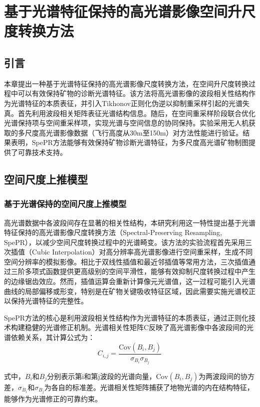 \chapter{基于光谱特征保持的高光谱影像空间升尺度转换方法}
\section{引言}
本章提出一种基于光谱特征保持的高光谱影像尺度转换方法，在空间升尺度转换过程中可以有效保持矿物的诊断光谱特征。该方法将高光谱影像的波段相关性结构作为光谱特征的本质表征，并引入Tikhonov正则化伪逆以抑制重采样引起的光谱失真。首先利用波段相关矩阵表征光谱结构信息。随后，在空间重采样阶段联合优化光谱保持项与空间重采样项，实现光谱与空间信息的协同保持。实验采用无人机获取的多尺度高光谱影像数据（飞行高度从30m至150m）对方法性能进行验证。结果表明，SpePR方法能够有效保持矿物诊断光谱特征，为多尺度高光谱矿物制图提供了可靠技术支持。
\section{空间尺度上推模型}
\subsection{基于光谱保持的空间尺度上推模型}
高光谱数据中各波段间存在显著的相关性结构\cite{manolakis2008spectral}，本研究利用这一特性提出基于光谱特征保持的高光谱影像尺度转换方法（Spectral-Preserving Resampling, SpePR），以减少空间尺度转换过程中的光谱畸变。该方法的实验流程首先采用三次插值（Cubic Interpolation）对高分辨率高光谱影像进行空间重采样，生成不同空间分辨率的模拟影像。相比于双线性插值和最近邻插值等常用方法，三次插值通过三阶多项式函数提供更高级别的空间平滑性，能够有效抑制尺度转换过程中产生的边缘锯齿效应\cite{gallagher2005detection,hanssen2002evaluation}。然而，插值运算会重新计算像元光谱值，这一过程可能引入光谱曲线的局部偏移或形变，特别是在矿物关键吸收特征区域，因此需要实施光谱校正以保持光谱特征的完整性。

SpePR方法的核心是利用波段相关性结构作为光谱特征的本质表征，通过正则化技术构建稳健的光谱修正机制。光谱相关性矩阵C反映了高光谱影像中各波段间的光谱依赖关系，其计算公式为：
\begin{equation}
C_{i,j}=\frac{\mathrm{Cov}(B_i,B_j)}{\sigma_{B_i}\sigma_{B_j}}
\label{eq:correlation_coeff}
\end{equation}

式中，$B_i$和$B_j$分别表示第i和第j波段的光谱向量，$\mathrm{Cov}(B_i,B_j)$为两波段间的协方差，$\sigma_{B_i}$和$\sigma_{B_j}$为各自的标准差。光谱相关性矩阵捕获了地物光谱的内在结构特征，能够作为光谱修正的可靠约束。

